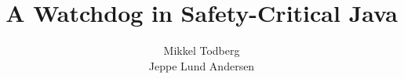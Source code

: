



	\title{A Watchdog in Safety-Critical Java}
	\author{Mikkel Todberg \\ Jeppe Lund Andersen}
	\maketitle

	\tableofcontents
	\cleardoublepage

	\pagestyle{plain}

	

